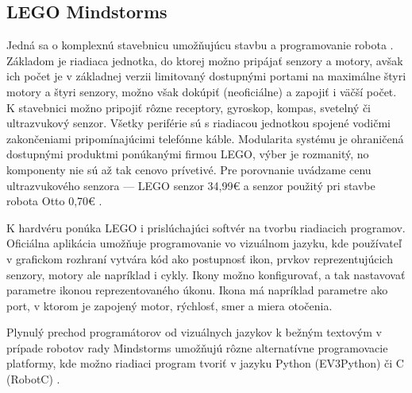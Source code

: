 \subsection{LEGO Mindstorms}
\label{sub:LegoMindstorms}
Jedná sa o komplexnú stavebnicu umožňujúcu stavbu a programovanie robota \cite{LegoMindstormsEducationSet}. Základom je riadiaca jednotka, do ktorej možno pripájať senzory a motory, avšak ich počet je v základnej verzii limitovaný dostupnými portami na maximálne štyri motory a štyri senzory, možno však dokúpiť (neoficiálne)  a zapojiť i väčší počet. K stavebnici možno pripojiť rôzne receptory, gyroskop, kompas, svetelný či ultrazvukový senzor. Všetky periférie sú s riadiacou jednotkou spojené vodičmi zakončeniami pripomínajúcimi telefónne káble. Modularita systému je ohraničená dostupnými produktmi ponúkanými firmou LEGO, výber je rozmanitý, no komponenty nie sú až tak cenovo prívetivé. Pre porovnanie uvádzame cenu ultrazvukového senzora --- LEGO senzor 34,99€ \cite{LegoMindstormsUltrasonic} a senzor použitý pri stavbe robota Otto 0,70€ \cite{OttoUltrasonic}.

K hardvéru ponúka LEGO i prislúchajúci softvér na tvorbu riadiacich programov. Oficiálna aplikácia umožňuje programovanie vo vizuálnom jazyku, kde používateľ v grafickom rozhraní vytvára kód ako postupnosť ikon, prvkov reprezentujúcich senzory, motory ale napríklad i cykly. Ikony možno konfigurovať, a tak nastavovať parametre ikonou reprezentovaného úkonu. Ikona  má napríklad parametre ako port, v ktorom je zapojený motor, rýchlosť, smer a miera otočenia.

Plynulý prechod programátorov od vizuálnych jazykov k bežným textovým v prípade robotov rady Mindstorms umožňujú rôzne alternatívne programovacie platformy, kde možno riadiaci program tvoriť v jazyku Python (EV3Python) či C (RobotC) \cite{LegoAlternatives}.











